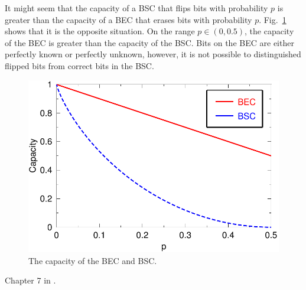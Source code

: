 
It might seem that the capacity of a {BSC} that flips bits with probability $p$ is greater than the capacity of a {BEC} that erases bits with probability $p$. Fig.~\ref{fig:becbsc} shows that it is the opposite situation. On the range $p\in\left( 0,0.5\right)$, the capacity of the {BEC} is greater than the capacity of the {BSC}. Bits on the {BEC} are either perfectly known or perfectly unknown, however, it is not possible to distinguished flipped bits from correct bits in the {BSC}.

\begin{figure}[h]
\begin{center}
\includegraphics[width=\linewidth]{figures/becbsc.pdf}
\caption{The capacity of the BEC and BSC.}
\label{fig:becbsc}
\end{center}
\end{figure}

Chapter 7 in \cite{Cover_91}. 
